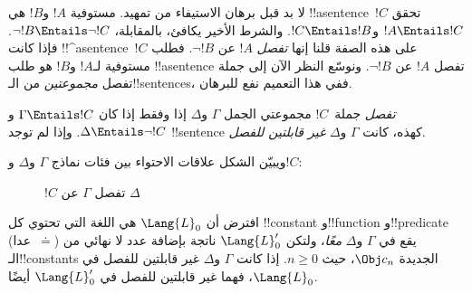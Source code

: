 \documentclass[../../../include/open-logic-section]{subfiles}
\begin{document}


لا بد قبل برهان الاستيفاء من تمهيد. مستوفية
$!A$ و$!B$ هي !!a{sentence}~$!C$ تحقق $!A \Entails !C$
و$!C \Entails !B$. والشرط الأخير يكافئ، بالمقابلة،
$\lnot !B \Entails \lnot !C$. فإذا كانت !!^a{sentence}~$!C$
على هذه الصفة قلنا إنها \emph{تفصل} $!A$ عن $\lnot !B$.
فطلب مستوفية لـ$!A$ و$!B$ هو طلب !!a{sentence}
تفصل $!A$ عن $\lnot !B$. ونوسّع النظر الآن إلى جملة
تفصل \emph{مجموعتين} من الـ!!{sentence}s، ففي هذا
التعميم نفع للبرهان.

\begin{defn}
\emph{تفصل} جملة~$!C$ مجموعتي الجمل $\Gamma$ و$\Delta$ إذا وفقط إذا كان
$\Gamma \Entails !C$ و$\Delta \Entails \lnot !C$. وإذا لم توجد
!!{sentence} كهذه، كانت $\Gamma$ و$\Delta$ \emph{غير قابلتين للفصل}.
\end{defn}

ويبيّن الشكل علاقات الاحتواء بين فئات نماذج $\Gamma$ و$\Delta$ و$!C$:
\begin{figure}[h]
  \centering
  \caption{$!C$ تفصل $\Gamma$ عن $\Delta$}
\end{figure}


\begin{lem}
افترض أن $\Lang{L}_0$ هي اللغة التي تحتوي كل !!{constant} و!!{function}
و!!{predicate} (عدا~$\doteq$) يقع في $\Gamma$ و$\Delta$ \emph{معًا}،
ولتكن $\Lang{L}'_0$ ناتجة بإضافة عدد لا نهائي من الـ!!{constant}s الجديدة
$\Obj c_n$، حيث $n \ge 0$. إذا كانت $\Gamma$ و$\Delta$ غير قابلتين
للفصل في $\Lang{L}_0$، فهما غير قابلتين للفصل في $\Lang{L}'_0$ أيضًا.
\end{lem}
\end{document}
